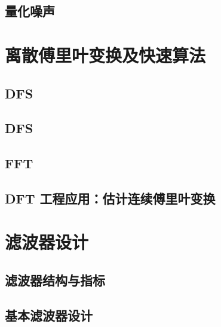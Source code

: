 \documentclass[en,11pt,english,black,simple,device=ppt]{elegantbook}
\begin{document}


\section{量化噪声}



\chapter{离散傅里叶变换及快速算法}

\section{DFS}



\section{DFS}



\section{FFT}




\section{DFT 工程应用：估计连续傅里叶变换}



\chapter{滤波器设计}

\section{滤波器结构与指标}



\section{基本滤波器设计}


\end{document}
